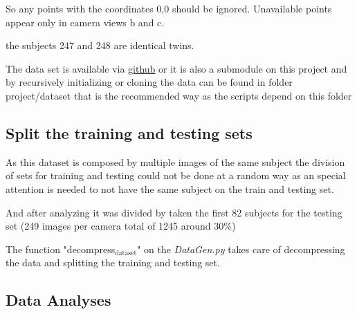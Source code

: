 \documentclass[11pt]{article}
\begin{document}
So any points with the coordinates 0,0 should be ignored.  Unavailable
points appear only in camera views b and c.  

the subjects 247 and 248 are identical twins.

The data set is available via \href{https://github.com/StephenMilborrow/muct}{github} or it is also a submodule on this
project and by recursively initializing or cloning the data can be found in 
folder project/dataset that is the recommended way as the scripts depend on
this folder 


\subsection{Split the training and testing sets}
\label{sec:org31a4e3a}

As this dataset is composed by multiple images of the same subject the
division of sets for training and testing could not be done at a random way
as an special attention is needed to not have the same subject on the train
and testing set.

And after analyzing it was divided by taken the first 82 subjects for the
testing set (249 images per camera total of 1245 around 30\%)

The function "decompress\(_{\text{dataset}}\)" on the \emph{DataGen.py} takes care of
decompressing the data and splitting the training and testing set. 

\subsection{Data Analyses}
\label{sec:orgc1b8eee}
\end{document}
